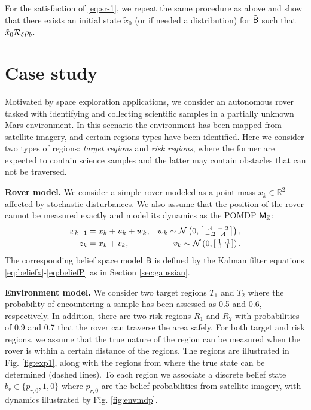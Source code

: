 \documentclass{ifacconf}
\begin{document}
For the satisfaction of \eqref{eq:sr-1}, we repeat the same procedure as above and show that there exists an initial state $\tilde x_{0}$ (or if needed a distribution) for $\tilde {\mathsf{B}}$ such that  $\tilde x_{0} \relax\mathcal{R}_\delta \rho_b$.


\section{Case study}
\label{sec:case}

Motivated by space exploration applications, we consider an autonomous rover tasked with identifying and collecting scientific samples in a partially unknown Mars environment. In this scenario the environment has been mapped from satellite imagery, and certain regions types have been identified. Here we consider two types of regions: \emph{target regions} and \emph{risk regions}, where the former are expected to contain science samples and the latter may contain obstacles that can not be traversed.

\textbf{Rover model.} We consider a simple rover modeled as a point mass $x_k \in \mathbb{R}^2$ affected by stochastic disturbances. We also assume that the position of the rover cannot be measured exactly and model its dynamics as the POMDP $\mathsf{M}_{{\mathbb{Z}}}$:
\begin{equation*}
\begin{aligned}
  x_{k+1}&= x_{k} + u_k+ w_k,  & w_k \sim \mathcal{N} \left(0,\begin{bsmallmatrix}.4&-.2\\-.2&.4\end{bsmallmatrix}\right), \\
  z_k&= x_k+v_k, &  v_k \sim \mathcal{N} \left(0,\begin{bsmallmatrix}1&.1\\.1&1\end{bsmallmatrix}\right).
\end{aligned}
\end{equation*}
The corresponding belief space model $\mathsf{B}$ is defined by the Kalman filter equations \eqref{eq:beliefx}-\eqref{eq:beliefP} as in Section \ref{sec:gaussian}.


\textbf{Environment model.} We consider two %
 target regions $T_1$ and $T_2$ where the probability of encountering a sample has been assessed as 0.5 and 0.6, respectively. In addition, there are two risk regions $R_1$ and $R_2$ with probabilities of 0.9 and 0.7 that the rover can traverse the area safely. For both target and risk regions, we assume that the true nature of the region can be measured when the rover is within a certain distance of the regions. The regions are illustrated in Fig. \ref{fig:exp1}, along with the regions from where the true state can be determined (dashed lines). To each region we associate a discrete belief state $b_r \in \{ p_{r,0}, 1, 0 \}$ where $p_{r,0}$ are the belief probabilities from satellite imagery, with dynamics illustrated by Fig. \ref{fig:envmdp}.
\end{document}
